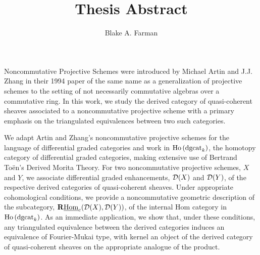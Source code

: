 \documentclass[11pt]{amsart}
\title{Thesis Abstract}
\author{Blake A. Farman}
\date{}
\begin{document}
\maketitle
Noncommutative Projective Schemes were introduced by Michael Artin and J.J. Zhang in their 1994 paper of the same name as a generalization of projective schemes to the setting of not necessarily commutative algebras over a commutative ring.
In this work, we study the derived category of quasi-coherent sheaves associated to a noncommutative projective scheme with a primary emphasis on the triangulated equivalences between two such categories.

We adapt Artin and Zhang's noncommutative projective schemes for the language of differential graded categories and work in \(\operatorname{Ho}\left(\operatorname{dgcat}_k\right)\), the homotopy category of differential graded categories, making extensive use of Bertrand To\"en's Derived Morita Theory.
For two noncommutative projective schemes, \(X\) and \(Y\), we associate differential graded enhancements, \(\mathcal{D}(X)\) and \(\mathcal{D}(Y)\), of the respective derived categories of quasi-coherent sheaves.
Under appropriate cohomological conditions, we provide a noncommutative geometric description of the subcategory, \(\mathbf{R}\underline{\operatorname{Hom}}_c(\mathcal{D}(X), \mathcal{D}(Y))\), of the internal Hom category in \(\operatorname{Ho}\left(\operatorname{dgcat}_k\right)\).
As an immediate application, we show that, under these conditions, any triangulated equivalence between the derived categories induces an equivalence of Fourier-Mukai type, with kernel an object of the derived category of quasi-coherent sheaves on the appropriate analogue of the product.
\end{document}
